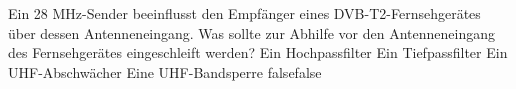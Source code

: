     {Ein 28 MHz-Sender beeinflusst den Empfänger eines DVB-T2-Fernsehgerätes über dessen Antenneneingang. Was sollte zur Abhilfe vor den Antenneneingang des Fernsehgerätes eingeschleift werden?}
    {Ein Hochpassfilter}
    {Ein Tiefpassfilter}
    {Ein UHF-Abschwächer}
    {Eine UHF-Bandsperre}
    {false}{false}